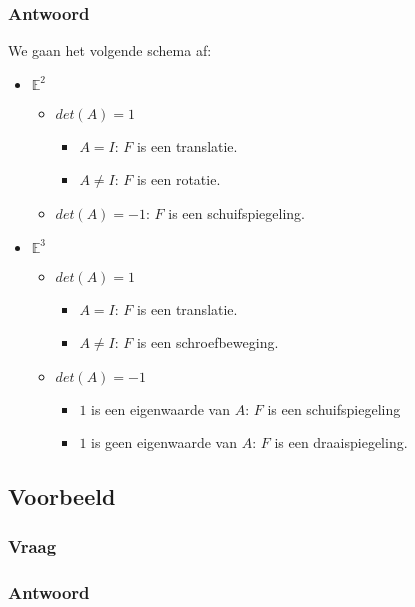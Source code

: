 \documentclass[main.tex]{subfiles}
\begin{document}
\subsubsection*{Antwoord}
We gaan het volgende schema af:
\begin{itemize}
\item $\mathbb{E}^{2}$
  \begin{itemize}
  \item $det(A) = 1$
    \begin{itemize}
    \item $A=I$: $F$ is een translatie.
    \item $A\neq I$: $F$ is een rotatie.
    \end{itemize}
  \item $det(A) = -1$: $F$ is een schuifspiegeling.
  \end{itemize}
\item $\mathbb{E}^{3}$
  \begin{itemize}
  \item $det(A) = 1$
    \begin{itemize}
    \item $A=I$: $F$ is een translatie.
    \item $A\neq I$: $F$ is een schroefbeweging.
    \end{itemize}
  \item $det(A) = -1$
    \begin{itemize}
    \item $1$ is een eigenwaarde van $A$: $F$ is een schuifspiegeling
    \item $1$ is geen eigenwaarde van $A$: $F$ is een draaispiegeling.
    \end{itemize}
  \end{itemize}
\end{itemize}
\subsection*{Voorbeeld}
\subsubsection*{Vraag}
\subsubsection*{Antwoord}
\end{document}
